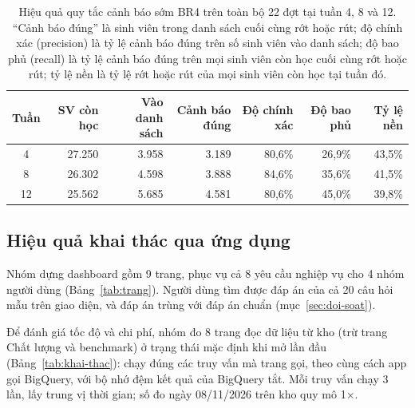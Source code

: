 \begin{table}[htbp]
\centering
\small
\begin{tabular}{|c|r|r|r|r|r|r|}
\hline
\textbf{Tuần} & \textbf{SV còn học} & \textbf{Vào danh sách} & \textbf{Cảnh báo đúng} & \textbf{Độ chính xác} & \textbf{Độ bao phủ} & \textbf{Tỷ lệ nền} \\ \hline
4  & 27.250 & 3.958 & 3.189 & 80,6\% & 26,9\% & 43,5\% \\ \hline
8  & 26.302 & 4.598 & 3.888 & 84,6\% & 35,6\% & 41,5\% \\ \hline
12 & 25.562 & 5.685 & 4.581 & 80,6\% & 45,0\% & 39,8\% \\ \hline
\end{tabular}
\caption{Hiệu quả quy tắc cảnh báo sớm BR4 trên toàn bộ 22 đợt tại tuần 4, 8 và 12. ``Cảnh báo
đúng'' là sinh viên trong danh sách cuối cùng rớt hoặc rút; độ chính xác (precision) là tỷ lệ cảnh
báo đúng trên số sinh viên vào danh sách; độ bao phủ (recall) là tỷ lệ cảnh báo đúng trên mọi sinh
viên còn học cuối cùng rớt hoặc rút; tỷ lệ nền là tỷ lệ rớt hoặc rút của mọi sinh viên còn học tại
tuần đó.}
\label{tab:br4-tuan}
\end{table}


\subsection{Hiệu quả khai thác qua ứng dụng}
\label{sec:khai-thac}

Nhóm dựng dashboard gồm 9 trang, phục vụ cả 8 yêu cầu nghiệp vụ cho 4 nhóm người dùng
(Bảng~\ref{tab:trang}). Người dùng tìm được đáp án của cả 20 câu hỏi mẫu trên giao diện, và đáp án
trùng với đáp án chuẩn (mục~\ref{sec:doi-soat}).

Để đánh giá tốc độ và chi phí, nhóm đo 8 trang đọc dữ liệu từ kho (trừ trang Chất lượng và
benchmark) ở trạng thái mặc định khi mở lần đầu (Bảng~\ref{tab:khai-thac}): chạy đúng các truy vấn mà trang gọi, theo cùng cách app gọi BigQuery,
với bộ nhớ đệm kết quả của BigQuery tắt. Mỗi truy vấn chạy 3 lần, lấy trung vị thời gian; số đo
ngày 08/11/2026 trên kho quy mô 1$\times$.

